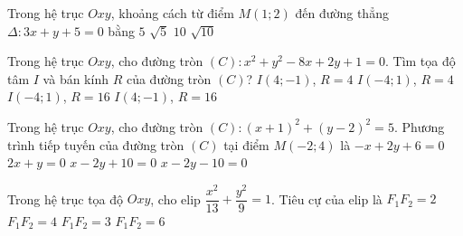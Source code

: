 \begin{ex}%
	Trong hệ trục $Oxy$, khoảng cách từ điểm $M\left(1; 2\right)$ đến đường thẳng $\Delta\colon 3x+y+5=0$ bằng
	\choice
	{$5$}
	{ $\sqrt{5}$}
	{$10$}
	{\True$\sqrt{10}$}
\end{ex}
\begin{ex}%
	Trong hệ trục $Oxy$, cho đường tròn $(C)\colon x^2+y^2-8x+2y+1=0$. Tìm tọa độ tâm $I$ và bán kính $R$ của đường tròn $(C)$?
	\choice
	{\True $I(4; -1)$, $R=4$}
	{ $I(-4; 1)$, $R=4$}
	{$I(-4; 1)$, $R=16$}
	{$I(4; -1)$, $R=16$}
\end{ex}

\begin{ex}%
	Trong hệ trục $Oxy$, cho đường tròn $(C)\colon \left(x+1\right)^2+\left(y-2\right)^2=5$. Phương trình tiếp tuyến của đường tròn $(C)$ tại điểm $M(-2; 4)$ là 
	\choice
	{$-x+2y+6=0$}
	{ $2x+y=0$}
	{\True$x-2y+10=0$}
	{$x-2y-10=0$}
\end{ex}

\begin{ex}%
	Trong hệ trục tọa độ $Oxy$, cho elip $\dfrac{x^2}{13}+\dfrac{y^2}{9}=1$. Tiêu cự của elip là
	\choice
	{$F_1F_2=2$}
	{\True $F_1F_2=4$}
	{$F_1F_2=3$}
	{$F_1F_2=6$}
\end{ex}

